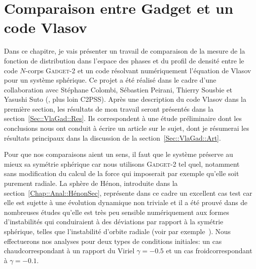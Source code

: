 \chapter{Comparaison entre Gadget et un code Vlasov\label{Chap::VlasovGadget}}
	\minitoc%



	Dans ce chapitre, je vais présenter un travail de comparaison de la mesure de la fonction de distribution dans l'espace des phases et du profil de densité
	entre le code $N$-corps \textsc{Gadget-2} et un code résolvant
	numériquement l'équation de Vlasov pour un système sphérique. Ce projet a été réalisé dans le cadre d'une collaboration avec Stéphane
	Colombi, Sébastien Peirani, Thierry Sousbie et Yasushi Suto (\citet{C2PSS}, plus loin C2PSS). Après une description du code Vlasov dans la première section, 
	les résultats de mon travail seront présentés dans la section~\ref{Sec::VlaGad::Res}. 
	Ils correspondent à une étude préliminaire dont les conclusions nous ont conduit à écrire un article sur le sujet, dont je résumerai les résultats
	principaux dans la discussion de la section~\ref{Sec::VlaGad::Art}.

	Pour que nos comparaisons aient un sens, il faut que le système préserve au mieux sa symétrie sphérique car nous utilisons \textsc{Gadget-2} tel quel,
	notamment sans modification du calcul de la force qui imposerait par exemple qu'elle soit purement radiale. La sphère de Hénon, introduite dans la
	section~\ref{Chap::Anal::HénonSec}, représente dans ce cadre un excellent cas test car elle est sujette à une évolution dynamique non triviale et il a été
	prouvé dans de nombreuses études qu'elle est très peu sensible numériquement aux formes d'instabilités qui conduiraient à des déviations par rapport à la
	symétrie sphérique, telles que l'instabilité d'orbite radiale (voir par exemple~\citet{albada,roy,barneslanzel}). Nous effectuerons nos analyses pour deux
	types de conditions initiales: un cas \og{}chaud\fg correspondant à un rapport du Viriel $\gamma=-0.5$ et un cas \og{}froid\fg correspondant à
	$\gamma=-0.1$.
	
